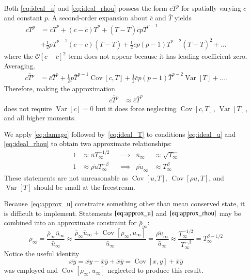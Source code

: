 \documentclass[letterpaper,11pt,nointlimits,reqno]{amsart}
\newcommand{\Cov}[2]{\ensuremath{\operatorname{Cov}\left[{#1},{#2}\right]}}
\newcommand{\Var}[1]{\ensuremath{\operatorname{Var}\left[{#1}\right]}}
\begin{document}
Both \eqref{eq:ideal_u} and \eqref{eq:ideal_rhou} possess the form $\overline{c
T^p}$ for spatially-varying $c$ and constant $p$.  A second-order expansion
about $\bar{c}$ and $\bar{T}$ yields
\begin{align}
  c T^p &= \bar{c} \bar{T}^p
         + \left(c - \bar{c}\right) \bar{T}^p
         + \left(T - \bar{T}\right) \bar{c} p \bar{T}^{p-1}
\\      &+ \frac{1}{2} p \bar{T}^{p-1} \left(c - \bar{c}\right)\left(T - \bar{T}\right)
         + \frac{1}{2} \bar{c} p \left(p-1\right) \bar{T}^{p-2} \left(T - \bar{T}\right)^2
         + \dots
\end{align}
where the $\mathcal{O}\left[c - \bar{c}\right]^2$ term does not appear because it
has leading coefficient zero.  Averaging,
\begin{align}
  \overline{c T^p} &= \bar{c} \bar{T}^p
                    + \frac{1}{2} p \bar{T}^{p-1} \Cov{c}{T}
                    + \frac{1}{2} \bar{c} p \left(p-1\right) \bar{T}^{p-2} \Var{T}
                    + \dots
.
\end{align}
Therefore, making the approximation
\begin{align}
  \label{eq:damage}
  \overline{c T^p} &\approx \bar{c} \bar{T}^p
\end{align}
does not require $\Var{c} = 0$ but it does force neglecting $\Cov{c}{T}$, $\Var{T}$,
and all higher moments.

We apply \eqref{eq:damage} followed by~\eqref{eq:ideal_T} to conditions
\eqref{eq:ideal_u} and \eqref{eq:ideal_rhou} to obtain two approximate
relationships:
\begin{align}
  \label{eq:approx_u}
  1 &\approx \bar{u} T_\infty^{-1/2}
  & &\implies
  & \bar{u}_\infty &\approx \sqrt{T_\infty}
\\
  \label{eq:approx_rhou}
  1 &\approx \overline{\rho u} T_\infty^{-\beta}
  & &\implies
  & \overline{\rho u}_\infty &\approx T_\infty^\beta
\end{align}
These statements are not unreasonable as $\Cov{u}{T}$, $\Cov{\rho u}{T}$, and
$\Var{T}$ should be small at the freestream.

Because~\eqref{eq:approx_u} constrains something other than mean conserved
state, it is difficult to implement.  Statements $\eqref{eq:approx_u}$ and
$\eqref{eq:approx_rhou}$ may be combined into an approximate constraint for
$\bar{\rho}_\infty$:
\begin{equation}
  \label{eq:approx_rho}
  \bar{\rho}_\infty
  =
  \frac{\bar{\rho}_\infty \bar{u}_\infty}
       {\bar{u}_\infty}
  \approx
  \frac{\bar{\rho}_\infty \bar{u}_\infty + \Cov{\rho_\infty}{u_\infty}}
       {\bar{u}_\infty}
  =
  \frac{\overline{\rho u}_\infty}
       {\bar{u}_\infty}
  \approx
  \frac{T_\infty^{-1/2}}{T_\infty^{-\beta}}
  =
  T_\infty^{\beta-1/2}
\end{equation}
Notice the useful identity
\begin{equation}
  \label{eq:covxy}
  \overline{xy} = \overline{xy} - \bar{x} \bar{y} + \bar{x} \bar{y}
                = \Cov{x}{y} + \bar{x} \bar{y}
\end{equation}
was employed and $\Cov{\rho_\infty}{u_\infty}$ neglected to produce this
result.
\end{document}
